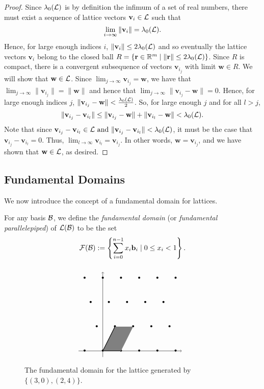 \documentclass[a4paper,12pt]{article}
\begin{document}
\begin{proof}
Since $\lambda_{0}(\mathcal{L})$ is by definition the infimum of a set of real numbers, there must exist a sequence of lattice vectors $\mathbf{v}_i \in \mathcal{L}$ such that $$\lim_{i\to\infty} \| \mathbf{v}_i \| = \lambda_{0}(\mathcal{L}).$$ Hence, for large enough indices $i$, $\| \mathbf{v}_i \| \leq 2\lambda_{0}(\mathcal{L})$ and so eventually the lattice vectors $\mathbf{v}_i$ belong to the closed ball $R = \lbrace \mathbf{r} \in \mathbb{R}^m \mid \|\mathbf{r}\| \leq 2\lambda_{0}(\mathcal{L}) \rbrace$. Since $R$ is compact, there is a convergent subsequence of vectors  $\mathbf{v}_{i_{j}}$ with limit $\mathbf{w} \in R$. We will show that $\mathbf{w} \in \mathcal{L}$. Since $\displaystyle\lim_{j\to\infty} \mathbf{v}_{i_{j}} = \mathbf{w}$, we have that $\displaystyle\lim_{j\to\infty} \| \mathbf{v}_{i_{j}} \| = \| \mathbf{w} \|$ and hence that $\displaystyle \lim_{j\to\infty} \| \mathbf{v}_{i_{j}} - \mathbf{w} \| = 0$. Hence, for large enough indices $j$, $\| \mathbf{v}_{i_{j}} - \mathbf{w} \| < \frac{\lambda_{0}(\mathcal{L})}{2}$. So, for large enough $j$ and for all $l > j$, $$\| \mathbf{v}_{i_{j}} -  \mathbf{v}_{i_{l}} \| \leq \| \mathbf{v}_{i_{j}} - \mathbf{w} \| + \| \mathbf{v}_{i_{l}} - \mathbf{w} \| < \lambda_{0}(\mathcal{L}).$$ Note that since $\mathbf{v}_{i_{j}} -  \mathbf{v}_{i_{l}} \in \mathcal{L} \text{ and } \| \mathbf{v}_{i_{j}} -  \mathbf{v}_{i_{l}} \| < \lambda_{0}(\mathcal{L})$, it must be the case that $\mathbf{v}_{i_{j}} -  \mathbf{v}_{i_{l}} = 0$. Thus, $\displaystyle\lim_{l\to\infty} \mathbf{v}_{i_{l}} = \mathbf{v}_{i_{j}}$. In other words, $\mathbf{w} = \mathbf{v}_{i_{j}}$, and we have shown that $\mathbf{w} \in \mathcal{L}$, as desired.

\end{proof}

\subsection{Fundamental Domains}

We now introduce the concept of a fundamental domain for lattices. 

\begin{defn}\label{fundamental domain}
For any basis $\mathcal{B}$, we define the \textit{fundamental domain} (or \textit{fundamental parallelepiped}) of $\mathcal{L}(\mathcal{B})$ to be the set $$\mathcal{F(\mathcal{B})} := \left\{ \sum_{i=0}^{n-1} x_{i}\mathbf{b}_{i} \mid 0 \leq x_{i} < 1 \right\}.$$
\end{defn}

\begin{figure}[H]
    $$
    \begin{tikzpicture}[scale=0.3]
    \draw[->, thin] (-4,0)--(13,0) node [right] {}; 
    \draw[->, thin] (0,-1)--(0,13) node [above] {};
    \foreach \Point in {(-3,0), (0,0), (3,0), (6,0), (9,0), (12,0), (-1,4), (2,4), (5,4), (8,4), (11,4), (-2,8), (1,8), (4,8), (7,8), (10,8), (-3,12), (0,12), (3,12), (6,12), (9,12), (12,12)}{
        \node at \Point {\textbullet};    
    }
    \path[fill=gray] (0,0)--(3,0)--(5,4)--(2,4)--(0,0);
    \draw[thick] (0,0)--(3,0);
    \draw[thick] (0,0)--(2,4);
    \end{tikzpicture}
    $$
    \caption{The fundamental domain for the lattice generated by $\lbrace (3,0), (2,4) \rbrace$.}
\end{figure}
\end{document}
